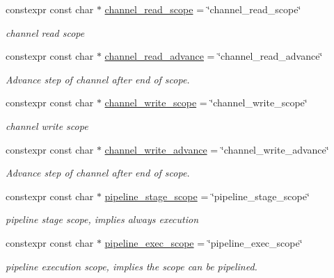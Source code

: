 \begin{DoxyCompactItemize}
constexpr const char $\ast$ \hyperlink{namespacetvm_1_1tir_1_1attr_ad39d05bd13aeed7af51e9f8e323d263b}{channel\+\_\+read\+\_\+scope} = \char`\"{}channel\+\_\+read\+\_\+scope\char`\"{}
\begin{DoxyCompactList}\small\item\em channel read scope \end{DoxyCompactList}\item 
constexpr const char $\ast$ \hyperlink{namespacetvm_1_1tir_1_1attr_a14632ed9597f1c21a0dbd23949e5916e}{channel\+\_\+read\+\_\+advance} = \char`\"{}channel\+\_\+read\+\_\+advance\char`\"{}
\begin{DoxyCompactList}\small\item\em Advance step of channel after end of scope. \end{DoxyCompactList}\item 
constexpr const char $\ast$ \hyperlink{namespacetvm_1_1tir_1_1attr_a52f378fc437bd4f7f6508c8e2e9b3e05}{channel\+\_\+write\+\_\+scope} = \char`\"{}channel\+\_\+write\+\_\+scope\char`\"{}
\begin{DoxyCompactList}\small\item\em channel write scope \end{DoxyCompactList}\item 
constexpr const char $\ast$ \hyperlink{namespacetvm_1_1tir_1_1attr_ad8886f0bca07d9fa56db9edea67b1a8d}{channel\+\_\+write\+\_\+advance} = \char`\"{}channel\+\_\+write\+\_\+advance\char`\"{}
\begin{DoxyCompactList}\small\item\em Advance step of channel after end of scope. \end{DoxyCompactList}\item 
constexpr const char $\ast$ \hyperlink{namespacetvm_1_1tir_1_1attr_a19ecbf068afc115a2282e533c0fe518d}{pipeline\+\_\+stage\+\_\+scope} = \char`\"{}pipeline\+\_\+stage\+\_\+scope\char`\"{}
\begin{DoxyCompactList}\small\item\em pipeline stage scope, implies always execution \end{DoxyCompactList}\item 
constexpr const char $\ast$ \hyperlink{namespacetvm_1_1tir_1_1attr_aee14d4d24b86179fd19938a02bc15512}{pipeline\+\_\+exec\+\_\+scope} = \char`\"{}pipeline\+\_\+exec\+\_\+scope\char`\"{}
\begin{DoxyCompactList}\small\item\em pipeline execution scope, implies the scope can be pipelined. \end{DoxyCompactList}\item 

\end{DoxyCompactItemize}
